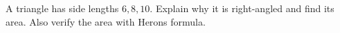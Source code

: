 A triangle has side lengths $6,8,10$. Explain why it is right-angled and find its area. Also verify the area with Heron\textquotesingle s formula.
